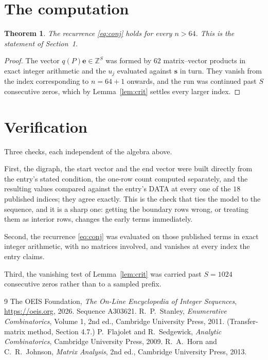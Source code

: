 \documentclass[11pt,a4paper]{article}
\theoremstyle{plain}
\newtheorem{theorem}{Theorem}
\theoremstyle{definition}
\begin{document}
\section{The computation}

\begin{theorem}
The recurrence \eqref{eq:conj} holds for every $n>64$. This is the statement of
Section~1.
\end{theorem}

\begin{proof}
The vector $q(P)\mathbf{e}\in\mathbb{Z}^{S}$ was formed by $62$ matrix--vector
products in exact integer arithmetic and the $u_j$ evaluated against $\mathbf{s}$ in turn.
They vanish from the index corresponding to $n=64+1$ onwards, and the run was continued
past $S$ consecutive zeros, which by Lemma~\ref{lem:crit} settles every larger index.
\end{proof}

\section{Verification}

Three checks, each independent of the algebra above.

First, the digraph, the start vector and the end vector were built directly from the
entry's stated condition, the one-row count computed separately, and the resulting values
compared against the entry's DATA at every one of the $18$ published indices; they
agree exactly. This is the check that ties the model to the sequence, and it is a sharp one:
getting the boundary rows wrong, or treating them as interior rows, changes the early terms
immediately.

Second, the recurrence \eqref{eq:conj} was evaluated on those published terms in exact
integer arithmetic, with no matrices involved, and vanishes at every index the entry claims.

Third, the vanishing test of Lemma~\ref{lem:crit} was carried past $S=1024$ consecutive
zeros rather than to a sampled prefix.

\begin{thebibliography}{9}
 The OEIS Foundation, \emph{The On-Line Encyclopedia of Integer
Sequences}, \url{https://oeis.org}, 2026. Sequence A303621.
 R.~P.~Stanley, \emph{Enumerative Combinatorics}, Volume 1, 2nd ed.,
Cambridge University Press, 2011. (Transfer-matrix method, Section 4.7.)
 P.~Flajolet and R.~Sedgewick, \emph{Analytic Combinatorics}, Cambridge
University Press, 2009.
 R.~A.~Horn and C.~R.~Johnson, \emph{Matrix Analysis}, 2nd ed., Cambridge
University Press, 2013.
\end{thebibliography}
\end{document}
